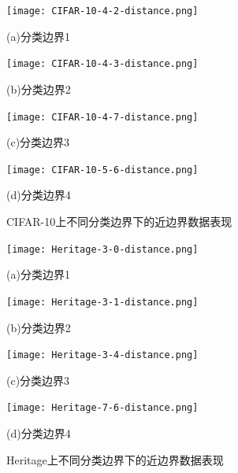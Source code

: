 \begin{figure}[htbp]%
	\centering
	\begin{minipage}[htbp]{0.49\linewidth}        %
		\hspace{2mm}
		\centering
		\texttt{[image: CIFAR-10-4-2-distance.png]}
		\centerline{(a)分类边界1}
	\end{minipage}
	\begin{minipage}[htbp]{0.49\linewidth}        %
		\hspace{2mm}
		\centering
		\texttt{[image: CIFAR-10-4-3-distance.png]}
		\centerline{(b)分类边界2}
	\end{minipage}
	\begin{minipage}[htbp]{0.49\linewidth}        %
		\hspace{2mm}
		\centering
		\texttt{[image: CIFAR-10-4-7-distance.png]}
		\centerline{(c)分类边界3}
	\end{minipage}
	\begin{minipage}[htbp]{0.49\linewidth}        %
		\hspace{2mm}
		\centering
		\texttt{[image: CIFAR-10-5-6-distance.png]}
		\centerline{(d)分类边界4}
	\end{minipage}
\setlength{\abovecaptionskip}{7mm} %
\caption{CIFAR-10上不同分类边界下的近边界数据表现}
\label{CIFAR-10上不同分类边界下的近边界数据表现}
\end {figure}

\begin{figure}[htbp]%
	\centering
	\begin{minipage}[htbp]{0.49\linewidth}        %
		\hspace{2mm}
		\centering
		\texttt{[image: Heritage-3-0-distance.png]}
		\centerline{(a)分类边界1}
	\end{minipage}
	\begin{minipage}[htbp]{0.49\linewidth}        %
		\hspace{2mm}
		\centering
		\texttt{[image: Heritage-3-1-distance.png]}
		\centerline{(b)分类边界2}
	\end{minipage}
	\begin{minipage}[htbp]{0.49\linewidth}        %
		\hspace{2mm}
		\centering
		\texttt{[image: Heritage-3-4-distance.png]}
		\centerline{(c)分类边界3}
	\end{minipage}
	\begin{minipage}[htbp]{0.49\linewidth}        %
		\hspace{2mm}
		\centering
		\texttt{[image: Heritage-7-6-distance.png]}
		\centerline{(d)分类边界4}
	\end{minipage}
\setlength{\abovecaptionskip}{7mm} %
\caption{Heritage上不同分类边界下的近边界数据表现}
\label{Heritage上不同分类边界下的近边界数据表现}
\end {figure}

